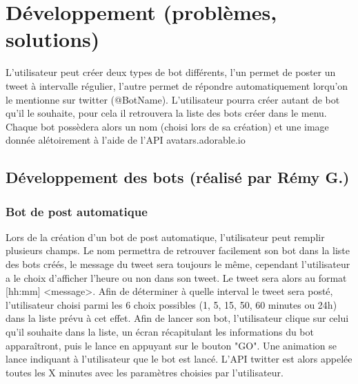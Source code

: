 \documentclass{article}
\begin{document}
\section{Développement (problèmes, solutions)}
L'utilisateur peut créer deux types de bot différents, l'un permet de poster un tweet à intervalle régulier, l'autre permet de répondre automatiquement lorqu'on le mentionne sur twitter (@BotName).
L'utilisateur pourra créer autant de bot qu'il le souhaite, pour cela il retrouvera la liste des bots créer dans le menu. Chaque bot possèdera alors un nom (choisi lors de sa création) et une image donnée alétoirement à l'aide de l'API avatars.adorable.io \citep{adorableio}

\subsection{Développement des bots (réalisé par Rémy G.)}

\subsubsection{Bot de post automatique}

Lors de la création d'un bot de post automatique, l'utilisateur peut remplir plusieurs champs. Le nom permettra de retrouver facilement son bot dans la liste des bots créés, le message du tweet sera toujours le même, cependant l'utilisateur a le choix d'afficher l'heure ou non dans son tweet. Le tweet sera alors au format [hh:mm] <message>. Afin de déterminer à quelle interval le tweet sera posté, l'utilisateur choisi parmi les 6 choix possibles (1, 5, 15, 50, 60 minutes ou 24h) dans la liste prévu à cet effet.
\newline\newline
Afin de lancer son bot, l'utilisateur clique sur celui qu'il souhaite dans la liste, un écran récapitulant les informations du bot apparaîtront, puis le lance en appuyant sur le bouton "GO". Une animation se lance indiquant à l'utilisateur que le bot est lancé. L'API twitter est alors appelée toutes les X minutes avec les paramètres choisies par l'utilisateur.
\end{document}
